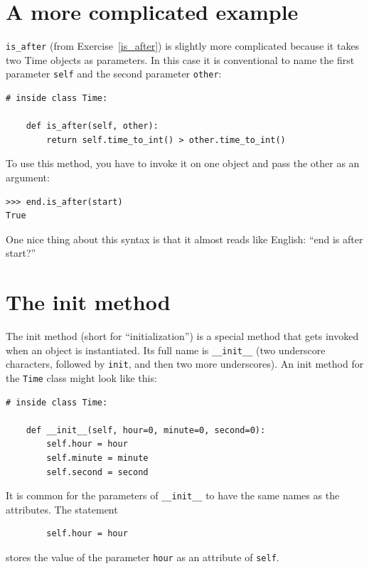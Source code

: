 \documentclass[10pt]{book}
\begin{document}
\section{A more complicated example}

\verb"is_after" (from Exercise~\ref{is_after}) is slightly more complicated
because it takes two Time objects as parameters.  In this case it is
conventional to name the first parameter {\tt self} and the second
parameter {\tt other}:


\beforeverb
\begin{verbatim}
# inside class Time:

    def is_after(self, other):
        return self.time_to_int() > other.time_to_int()
\end{verbatim}
\afterverb
%
To use this method, you have to invoke it on one object and pass
the other as an argument:

\beforeverb
\begin{verbatim}
>>> end.is_after(start)
True
\end{verbatim}
\afterverb
%
One nice thing about this syntax is that it almost reads
like English: ``end is after start?''


\section{The init method}


The init method (short for ``initialization'') is
a special method that gets invoked when an object is instantiated.  
Its full name is \verb"__init__" (two underscore characters,
followed by {\tt init}, and then two more underscores).  An
init method for the {\tt Time} class might look like this:

\beforeverb
\begin{verbatim}
# inside class Time:

    def __init__(self, hour=0, minute=0, second=0):
        self.hour = hour
        self.minute = minute
        self.second = second
\end{verbatim}
\afterverb
%
It is common for the parameters of \verb"__init__"
to have the same names as the attributes.  The statement

\beforeverb
\begin{verbatim}
        self.hour = hour
\end{verbatim}
\afterverb
%
stores the value of the parameter {\tt hour} as an attribute
of {\tt self}.
\end{document}
